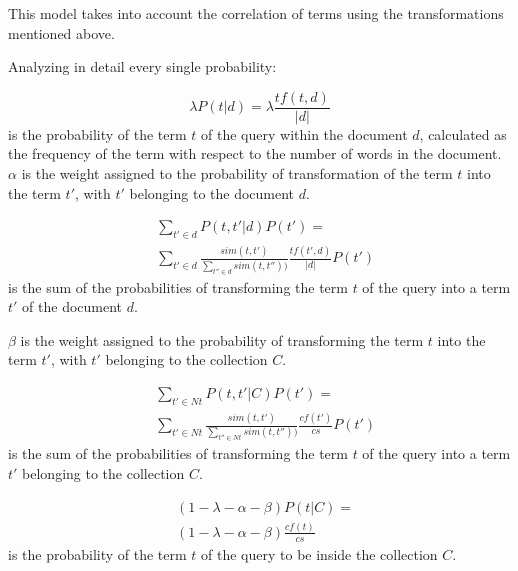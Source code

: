 This model takes into account the correlation of terms using the transformations
mentioned above.

Analyzing in detail every single probability: 
    
\begin{equation}
    \lambda P(t|d)=\lambda \frac{tf(t,d)}{|d|}
\end{equation} is the probability of the term $t$ of the query within the document $d$, calculated as the frequency of the term with respect to the number of words in the document.
$\alpha$ is the weight assigned to the probability of transformation of the term $t$ into the term ${t}'$, with ${t}'$ belonging to the document $d$.

\begin{equation}
    \begin{split}
    &\sum_{{t}'\in d}P(t,{t}'|d)P({t}')=\\
    &\sum_{{t}'\in d}\frac{sim(t,{t}')}{\sum_{{t}''\in d}sim(t,{t}''))}\frac{tf({t}',d)}{|d|}P({t}')
    \end{split}
\end{equation}
is the sum of the probabilities of transforming the term $t$ of the query into a term ${t}'$ of the document $d$.

$\beta$ is the weight assigned to the probability of transforming the term $t$ into the term ${t}'$, with ${t}'$ belonging to the collection $C$.

\begin{equation}
    \begin{split}
        & \sum_{{t}'\in Nt}P(t,{t}'|C)P({t}')=\\
        & \sum_{{t}'\in Nt}\frac{sim(t,{t}')}{\sum_{{t}''\in Nt}sim(t,{t}''))}\frac{cf({t}')}{cs}P({t}')
    \end{split}
\end{equation}
is the sum of the probabilities of transforming the term $t$ of the query into a term ${t}'$ belonging to the collection $C$.

\begin{equation}
    \begin{split}
        & (1-\lambda-\alpha-\beta)P(t|C)=\\
        & (1-\lambda-\alpha-\beta)\frac{cf(t)}{cs}
    \end{split}
\end{equation}
is the probability of the term $t$ of the query to be inside the collection $C$.


